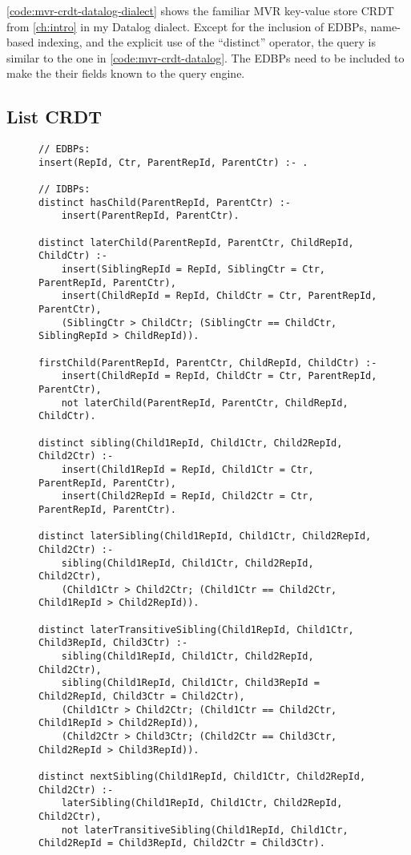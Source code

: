 \ref{code:mvr-crdt-datalog-dialect} shows the familiar \ac{MVR} key-value store
\ac{CRDT} from \ref{ch:intro} in my Datalog dialect.
Except for the inclusion of \acp{EDBP}, name-based indexing, and the explicit
use of the ``distinct'' operator, the query is similar to the one
in \ref{code:mvr-crdt-datalog}.
The \acp{EDBP} need to be included to make the their fields known to the
query engine.

\subsection{List \ac{CRDT}}\label{sec:list-crdt-datalog-dialect}

\begin{figure}[htpb]
	\begin{lstlisting}[keepspaces]
// EDBPs:
insert(RepId, Ctr, ParentRepId, ParentCtr) :- .

// IDBPs:
distinct hasChild(ParentRepId, ParentCtr) :-
    insert(ParentRepId, ParentCtr).

distinct laterChild(ParentRepId, ParentCtr, ChildRepId, ChildCtr) :-
    insert(SiblingRepId = RepId, SiblingCtr = Ctr, ParentRepId, ParentCtr),
    insert(ChildRepId = RepId, ChildCtr = Ctr, ParentRepId, ParentCtr),
    (SiblingCtr > ChildCtr; (SiblingCtr == ChildCtr, SiblingRepId > ChildRepId)).

firstChild(ParentRepId, ParentCtr, ChildRepId, ChildCtr) :-
    insert(ChildRepId = RepId, ChildCtr = Ctr, ParentRepId, ParentCtr),
    not laterChild(ParentRepId, ParentCtr, ChildRepId, ChildCtr).

distinct sibling(Child1RepId, Child1Ctr, Child2RepId, Child2Ctr) :-
    insert(Child1RepId = RepId, Child1Ctr = Ctr, ParentRepId, ParentCtr),
    insert(Child2RepId = RepId, Child2Ctr = Ctr, ParentRepId, ParentCtr).

distinct laterSibling(Child1RepId, Child1Ctr, Child2RepId, Child2Ctr) :-
    sibling(Child1RepId, Child1Ctr, Child2RepId, Child2Ctr),
    (Child1Ctr > Child2Ctr; (Child1Ctr == Child2Ctr, Child1RepId > Child2RepId)).

distinct laterTransitiveSibling(Child1RepId, Child1Ctr, Child3RepId, Child3Ctr) :-
    sibling(Child1RepId, Child1Ctr, Child2RepId, Child2Ctr),
    sibling(Child1RepId, Child1Ctr, Child3RepId = Child2RepId, Child3Ctr = Child2Ctr),
    (Child1Ctr > Child2Ctr; (Child1Ctr == Child2Ctr, Child1RepId > Child2RepId)),
    (Child2Ctr > Child3Ctr; (Child2Ctr == Child3Ctr, Child2RepId > Child3RepId)).

distinct nextSibling(Child1RepId, Child1Ctr, Child2RepId, Child2Ctr) :-
    laterSibling(Child1RepId, Child1Ctr, Child2RepId, Child2Ctr),
    not laterTransitiveSibling(Child1RepId, Child1Ctr, Child2RepId = Child3RepId, Child2Ctr = Child3Ctr).


\end{lstlisting}
\end{figure}
